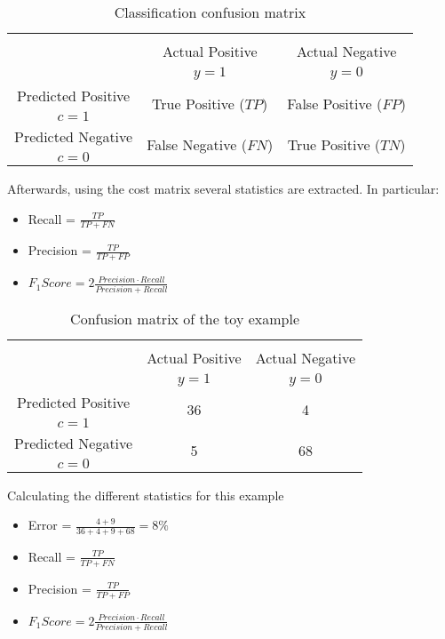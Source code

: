 	\begin{table}[!t]
		\centering
		\footnotesize
    \begin{tabular}{c|c|c}
      \multicolumn{3}{c}{}\\
			\multicolumn{1}{c|}{}  & Actual Positive& Actual Negative \\
			\multicolumn{1}{c|}{} & $y=1$& $y=0$ \\
			\hline
			Predicted Positive 		& \multirow{ 2}{*}{True Positive ($TP$)} & \multirow{ 
			2}{*}{False Positive ($FP$)} \\
			$c=1$ & &\\
			\hline
			Predicted Negative  	& \multirow{ 2}{*}{False Negative ($FN$)} & \multirow{ 
			2}{*}{True Positive ($TN$)} \\
			$c=0$ & &\\
		\end{tabular}
		\caption{Classification confusion matrix}
		\label{tab:2:1}
  \end{table}  

Afterwards, using the cost matrix several statistics are extracted. In particular:
	\begin{itemize}
		\item Recall = $\frac{TP}{TP+FN}$
		\item Precision = $\frac{TP}{TP+FP}$
		\item $F_1Score = 2\frac{Precision \cdot Recall}{Precision + Recall}$
	\end{itemize}

 	\begin{table}[!t]
		\centering
		\footnotesize
    \begin{tabular}{c|c|c}
      \multicolumn{3}{c}{}\\
			\multicolumn{1}{c|}{}  & Actual Positive& Actual Negative \\
			\multicolumn{1}{c|}{} & $y=1$& $y=0$ \\
			\hline
			Predicted Positive 		& \multirow{ 2}{*}{36} & \multirow{ 
			2}{*}{4} \\
			$c=1$ & &\\
			\hline
			Predicted Negative  	& \multirow{ 2}{*}{5} & \multirow{ 
			2}{*}{68} \\
			$c=0$ & &\\
		\end{tabular}
		\caption{Confusion matrix of the toy example}
		\label{tab:ch2:2}
  \end{table}  
  
  Calculating the different statistics for this example
  	\begin{itemize}
  	\item Error = $\frac{4+9}{36+4+9+68}=8\%$
		\item Recall = $\frac{TP}{TP+FN}$
		\item Precision = $\frac{TP}{TP+FP}$
		\item $F_1Score = 2\frac{Precision \cdot Recall}{Precision + Recall}$
	\end{itemize}
	
